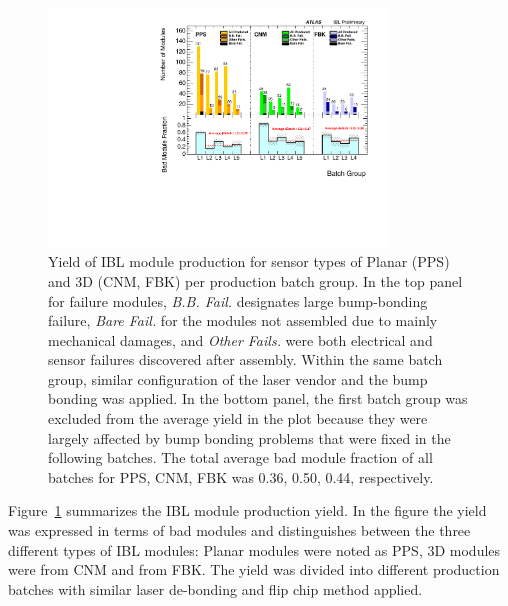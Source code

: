 \begin{figure}
	\centering
		 \includegraphics[width=0.8\textwidth]{Images/ibl_paper/chapter04_Modules/ModuleProductionYield_Combined.pdf}
	\caption{\textbf{}Yield of IBL module production for sensor types of Planar (PPS) and 3D (CNM, FBK) per production batch group. In the top panel for failure modules,  \textit{B.B. Fail.} designates large bump-bonding failure,  \textit{Bare Fail.} for the modules not assembled due to mainly mechanical damages, and \textit{Other Fails.} were both electrical and sensor failures discovered after assembly. Within the same batch group, similar configuration of the laser vendor and the bump bonding was applied. In the bottom panel, the first batch group was excluded from the average yield in the plot because they were largely affected by bump bonding problems that were fixed in the following batches. The total average bad module fraction of all batches for PPS, CNM, FBK was 0.36, 0.50, 0.44, respectively.}
\label{fig:module_yield}
\end{figure}

Figure~\ref{fig:module_yield} summarizes the IBL module production yield. In the figure the yield was expressed in terms of bad modules and distinguishes between the three different types of IBL modules: Planar  modules were noted as PPS, 3D modules were from CNM and from FBK. The yield was divided into different production batches with similar laser de-bonding and flip chip method applied. %


